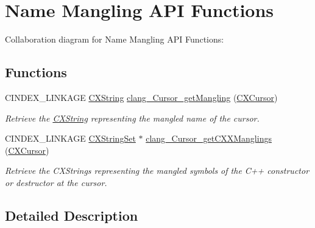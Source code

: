 \hypertarget{group__CINDEX__MANGLE}{}\section{Name Mangling A\+PI Functions}
\label{group__CINDEX__MANGLE}
Collaboration diagram for Name Mangling A\+PI Functions\+:
\subsection*{Functions}
\begin{DoxyCompactItemize}
\item 
\mbox{\label{group__CINDEX__MANGLE_ga5d471df1f0608075193c33753549250a}} 
C\+I\+N\+D\+E\+X\+\_\+\+L\+I\+N\+K\+A\+GE \hyperlink{structCXString}{C\+X\+String} \hyperlink{group__CINDEX__MANGLE_ga5d471df1f0608075193c33753549250a}{clang\+\_\+\+Cursor\+\_\+get\+Mangling} (\hyperlink{structCXCursor}{C\+X\+Cursor})
\begin{DoxyCompactList}\small\item\em Retrieve the \hyperlink{structCXString}{C\+X\+String} representing the mangled name of the cursor. \end{DoxyCompactList}\item 
\mbox{\label{group__CINDEX__MANGLE_ga27a071c8adf5c10b09c6b0b0aba54b79}} 
C\+I\+N\+D\+E\+X\+\_\+\+L\+I\+N\+K\+A\+GE \hyperlink{structCXStringSet}{C\+X\+String\+Set} $\ast$ \hyperlink{group__CINDEX__MANGLE_ga27a071c8adf5c10b09c6b0b0aba54b79}{clang\+\_\+\+Cursor\+\_\+get\+C\+X\+X\+Manglings} (\hyperlink{structCXCursor}{C\+X\+Cursor})
\begin{DoxyCompactList}\small\item\em Retrieve the C\+X\+Strings representing the mangled symbols of the C++ constructor or destructor at the cursor. \end{DoxyCompactList}\end{DoxyCompactItemize}


\subsection{Detailed Description}
